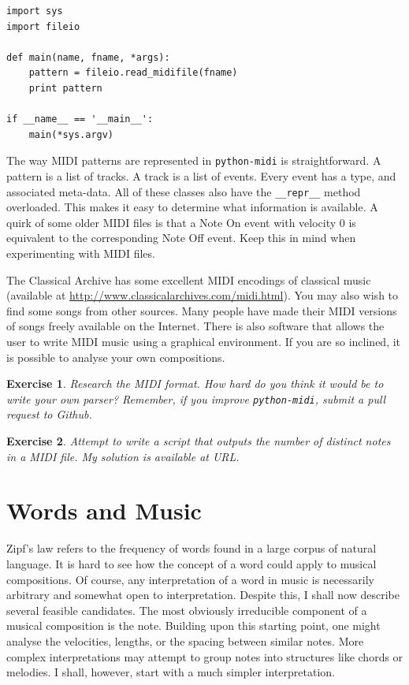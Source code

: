 \documentclass[10pt]{book}
\newtheorem{exercise}{Exercise}[chapter]
\begin{document}
\begin{verbatim}
import sys
import fileio

def main(name, fname, *args):
    pattern = fileio.read_midifile(fname)
    print pattern

if __name__ == '__main__':
    main(*sys.argv)

\end{verbatim}


The way MIDI patterns are represented in \texttt{python-midi} is straightforward. A pattern is a list of tracks. A track is a list of events. Every event has a type, and associated meta-data. All of these classes also have the \texttt{\_\_repr\_\_} method overloaded. This makes it easy to determine what information is available. A quirk of some older MIDI files is that a Note On event with velocity 0 is equivalent to the corresponding Note Off event. Keep this in mind when experimenting with MIDI files.

The Classical Archive has some excellent MIDI encodings of classical music (available at \url{http://www.classicalarchives.com/midi.html}). You may also wish to find some songs from other sources. Many people have made their MIDI versions of songs freely available on the Internet. There is also software that allows the user to write MIDI music using a graphical environment. If you are so inclined, it is possible to analyse your own compositions.


\begin{exercise}
Research the MIDI format. How hard do you think it would be to write your own parser? Remember, if you improve \texttt{python-midi}, submit a pull request to Github.
\end{exercise}

\begin{exercise}
Attempt to write a script that outputs the number of distinct notes in a MIDI file. My solution is available at URL.
\end{exercise}


\section{Words and Music}

Zipf's law refers to the frequency of words found in a large corpus of natural language. It is hard to see how the concept of a word could apply to musical compositions. Of course, any interpretation of a word in music is necessarily arbitrary and somewhat open to interpretation. Despite this, I shall now describe several feasible candidates. The most obviously irreducible component of a musical composition is the note. Building upon this starting point, one might analyse the velocities, lengths, or the spacing between similar notes. More complex interpretations may attempt to group notes into structures like chords or melodies. I shall, however, start with a much simpler interpretation.
\end{document}
